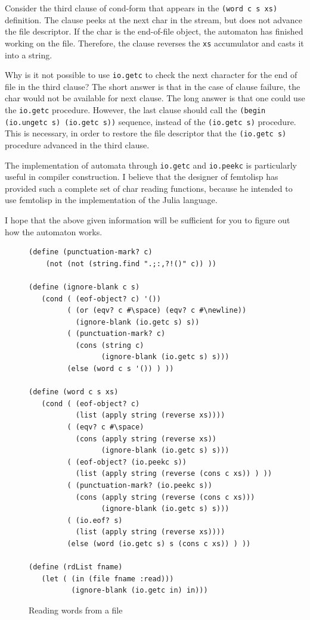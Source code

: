 \documentclass[a4paper,12pt]{book}
\begin{document}
Consider the third clause of
cond-form that appears in
the \verb|(word c s xs)| definition.
The clause peeks at the next
char in the stream, but does not 
advance the file descriptor. If the
char is the end-of-file object,
the automaton has finished working on the
file. Therefore, the clause reverses
the \verb|xs| accumulator and 
casts it into a string.

Why is it not possible to use \verb|io.getc|
to check the next character for
the end of file in the third clause? 
The short answer
is that in the case of clause 
failure, the char would not be 
available for next clause.
The long answer is that one
could use the \verb|io.getc|
procedure. However, 
the last clause should 
call the \verb|(begin (io.ungetc s) (io.getc s))|
sequence,
instead of the \verb|(io.getc s)| procedure.
This is necessary, in order
to restore the file descriptor 
that the \verb|(io.getc s)|
procedure advanced in the third clause.

The implementation of automata through
\verb|io.getc| and \verb|io.peekc| is
particularly useful in compiler construction.
I believe that the designer of femtolisp
has provided such a complete set of
char reading functions, because he
intended to use femtolisp in the
implementation of the Julia language.

I hope that the above given
information will be sufficient for you to 
figure out how the automaton works.

\begin{figure}[!b]
\begin{verbatim}
(define (punctuation-mark? c)
    (not (not (string.find ".;:,?!()" c)) ))

(define (ignore-blank c s)
   (cond ( (eof-object? c) '())
         ( (or (eqv? c #\space) (eqv? c #\newline)) 
           (ignore-blank (io.getc s) s))
         ( (punctuation-mark? c)
           (cons (string c) 
                 (ignore-blank (io.getc s) s)))
         (else (word c s '()) ) )) 

(define (word c s xs)
   (cond ( (eof-object? c)
           (list (apply string (reverse xs))))
         ( (eqv? c #\space)
           (cons (apply string (reverse xs))
                 (ignore-blank (io.getc s) s)))
         ( (eof-object? (io.peekc s))
           (list (apply string (reverse (cons c xs)) ) ))
         ( (punctuation-mark? (io.peekc s))
           (cons (apply string (reverse (cons c xs)))
                 (ignore-blank (io.getc s) s)))
         ( (io.eof? s)
           (list (apply string (reverse xs))))
         (else (word (io.getc s) s (cons c xs)) ) ))

(define (rdList fname)
   (let ( (in (file fname :read)))
          (ignore-blank (io.getc in) in)))
\end{verbatim}
\caption{Reading words from a file}
\label{wordsFromFile}
\end{figure}
\end{document}
